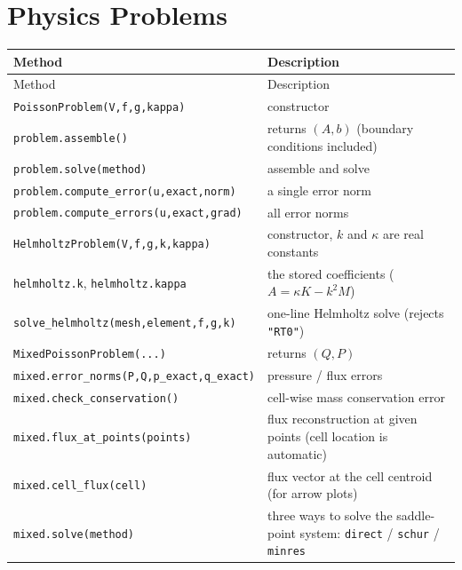 \documentclass[11pt,oneside]{book}
\theoremstyle{definition}
\theoremstyle{plain}
\newcommand{\code}[1]{\texttt{#1}}
\begin{document}
\endgroup

\section{Physics Problems}

\begingroup\small
\begin{longtable}{@{}L{5.0cm}L{9.4cm}@{}}
\toprule
Method & Description \\
\midrule
\endfirsthead
\toprule
Method & Description \\
\midrule
\endhead
\code{PoissonProblem(V,\allowbreak  f,\allowbreak  g,\allowbreak  kappa)} & constructor \\
\code{problem.assemble()} & returns $(A,b)$ (boundary conditions included) \\
\code{problem.solve(method)} & assemble and solve \\
\code{problem.compute\_\allowbreak error(u,\allowbreak  exact,\allowbreak  norm)} & a single error norm \\
\code{problem.compute\_\allowbreak errors(u,\allowbreak  exact,\allowbreak  grad)} & all error norms \\
\code{HelmholtzProblem(V,\allowbreak  f,\allowbreak  g,\allowbreak  k,\allowbreak  kappa)} & constructor, $k$ and $\kappa$ are real constants \\
\code{helmholtz.k}, \code{helmholtz.kappa} & the stored coefficients ($A=\kappa K-k^2M$) \\
\code{solve\_\allowbreak helmholtz(mesh,\allowbreak  element,\allowbreak  f,\allowbreak  g,\allowbreak  k)} & one-line Helmholtz solve (rejects \code{"RT0"}) \\
\code{MixedPoissonProblem(...)} & returns $(Q,P)$ \\
\code{mixed.error\_\allowbreak norms(P,\allowbreak  Q,\allowbreak  p\_\allowbreak exact,\allowbreak  q\_\allowbreak exact)} & pressure / flux errors \\
\code{mixed.check\_\allowbreak conservation()} & cell-wise mass conservation error \\
\code{mixed.flux\_\allowbreak at\_\allowbreak points(points)} & flux reconstruction at given points (cell location is automatic) \\
\code{mixed.cell\_\allowbreak flux(cell)} & flux vector at the cell centroid (for arrow plots) \\
\code{mixed.solve(method)} & three ways to solve the saddle-point system: \code{direct} / \code{schur} / \code{minres} \\
\bottomrule
\end{longtable}
\endgroup
\end{document}
